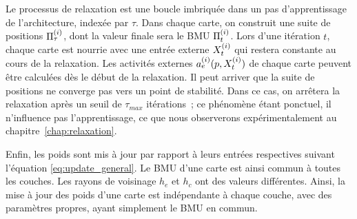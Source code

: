 \documentclass[../main]{subfiles}
\begin{document}
Le processus de relaxation est une boucle imbriquée dans un pas d'apprentissage de l'architecture, indexée par $\tau$. Dans chaque carte, on construit une suite de positions $\Pi^{({i})}_\tau$, dont la valeur finale sera le BMU $\Pi^{({i})}_t$.
Lors d'une itération $t$, chaque carte est nourrie avec une entrée externe $X^{({i})}_t$ qui restera constante au cours de la relaxation. Les activités externes $a_e^{({i})}(p, X^{({i})}_t)$ de chaque carte peuvent être calculées dès le début de la relaxation.
Il peut arriver que la suite de positions ne converge pas vers un point de stabilité. Dans ce cas, on arrêtera la relaxation après un seuil de $\tau_{max}$ itérations~; ce phénomène étant ponctuel, il n'influence pas l'apprentissage, ce que nous observerons expérimentalement au chapitre~\ref{chap:relaxation}.

Enfin, les poids sont mis à jour par rapport à leurs entrées respectives suivant l'équation \ref{eq:update_general}. Le BMU d'une carte est ainsi commun à toutes les couches. 
Les rayons de voisinage $h_e$ et $h_c$ ont des valeurs différentes.
Ainsi, la mise à jour des poids d'une carte est indépendante à chaque couche, avec des paramètres propres, ayant simplement le BMU en commun.
\end{document}
